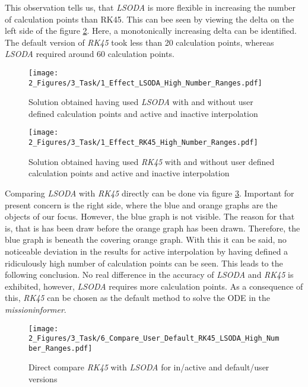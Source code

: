 This observation tells us, that \emph{LSODA} is more 
flexible in increasing the number of 
calculation points than RK45. This 
can bee seen by viewing the delta on the 
left side of the figure \ref{fig_14_RK45_Inter}.
Here, a monotonically increasing delta  can be identified. 
The default version of
\emph{RK45} took less than 20 calculation points, 
whereas \emph{LSODA} required around 60 
calculation points.


\begin{figure}[!h]
    \centering
    \texttt{[image: 2\_Figures/3\_Task/1\_Effect\_LSODA\_High\_Number\_Ranges.pdf]}
    \caption{Solution obtained having used \emph{LSODA} with and without user defined 
    calculation points and active and inactive interpolation}
    \label{fig_13_LSODA_Inter}
\end{figure}


\begin{figure}[!h]
    \centering
    \texttt{[image: 2\_Figures/3\_Task/1\_Effect\_RK45\_High\_Number\_Ranges.pdf]}
    \caption{Solution obtained having used \emph{RK45} with and without user defined 
    calculation points and active and inactive interpolation}
    \label{fig_14_RK45_Inter}
\end{figure}


\FloatBarrier
Comparing \emph{LSODA} with \emph{RK45} directly can be done 
via figure \ref{fig_15_RK45_LSODA}. Important 
for present concern is the right side, where 
the blue and orange graphs are the objects of 
our focus. However, the blue graph is not visible.
The reason for that is, that is has been 
draw before the orange graph has been drawn.
Therefore, the blue graph is beneath the 
covering orange graph. With this it can be 
said, no noticeable deviation in the 
results for active interpolation by having 
defined a ridiculously high number 
of calculation points can be seen. This leads to 
the following conclusion. No real difference 
in the accuracy of \emph{LSODA} and \emph{RK45} is 
exhibited, however, \emph{LSODA} requires more 
calculation points. As a consequence 
of this, \emph{RK45} can be chosen as the 
default method to solve the ODE 
in the \emph{missioninformer}.


\begin{figure}[!h]
    \centering
    \texttt{[image: 2\_Figures/3\_Task/6\_Compare\_User\_Default\_RK45\_LSODA\_High\_Number\_Ranges.pdf]}
    \caption{Direct compare \emph{RK45} with \emph{LSODA} for in/active and default/user versions}
    \label{fig_15_RK45_LSODA}
\end{figure}

